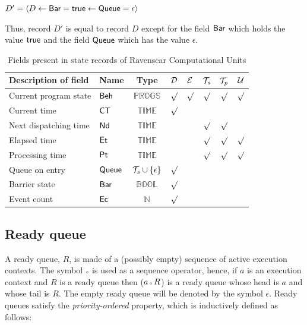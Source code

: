 \begin{center}
$D'=
  \langle
    D\gets\text{\sffamily Bar}=\text{\sffamily true}\gets\text{\sffamily Queue}=\epsilon
  \rangle$
\end{center}

Thus, record $D'$ is equal to record $D$ except for the field
$\text{\sffamily Bar}$ which holds the value $\text{\sffamily true}$ and the field
$\text{\sffamily Queue}$ which has the value $\epsilon$.


\begin{table}
\centering
\begin{tabular}{|l|l|c|c|c|c|c|c|}
\hline
Description of field & Name & Type 
& ${\cal D}$ & ${\cal E}$ & ${\cal T}_s$ & ${\cal T}_p$ & ${\cal U}$ \\ 
\hline
Current program state & 
$\text{\sffamily Beh}$ & ${\scriptstyle \mathbb{PROGS}}$
& $\surd$ & $\surd$ & $\surd$ & $\surd$ & $\surd$ \\
\hline
Current time & 
$\text{\sffamily CT}$ & ${\scriptstyle \mathbb{TIME}}$
& $\surd$ &  &  &  &  \\
\hline
Next dispatching time &
$\text{\sffamily Nd}$ & ${\scriptstyle \mathbb{TIME}}$
&  &  & $\surd$ & $\surd$ &  \\
\hline
Elapsed time & 
$\text{\sffamily Et}$ & ${\scriptstyle \mathbb{TIME}}$
&  &  & $\surd$ & $\surd$ & $\surd$ \\
\hline
Processing time & 
$\text{\sffamily Pt}$ & ${\scriptstyle \mathbb{TIME}}$
&  &  & $\surd$ & $\surd$ & $\surd$ \\
\hline
Queue on entry & 
$\text{\sffamily Queue}$ & ${\cal T}_s \cup \{\epsilon\}$
& $\surd$ &  &  &  &  \\
\hline
Barrier state & 
$\text{\sffamily Bar}$ & ${\scriptstyle \mathbb{BOOL}}$
& $\surd$ &  &  &  &  \\
\hline
Event count & 
$\text{\sffamily Ec}$ & $\mathbb{N}$
& $\surd$ &  &  &  &  \\
\hline
\end{tabular}
\caption{Fields present in state records of Ravenscar Computational Units}
\label{tab:fields}
\end{table}

\subsection{Ready queue}
A ready queue, $R$, is made of a (possibly empty) sequence of active
execution contexts. The symbol ${\scriptscriptstyle \circ}$ is used as a sequence
operator, hence, if $a$ is an execution context and $R$ is a ready
queue then ($a \, {\scriptscriptstyle \circ} \, R$) is a ready queue whose head is $a$
and whose tail is $R$. The empty ready queue will be denoted by the
symbol $\epsilon$. Ready queues satisfy the \emph{priority-ordered}
property, which is inductively defined as follows:

